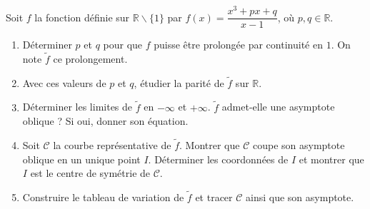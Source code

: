 \documentclass[11pt]{article}
\def\setminus{\mathbin{\backslash}}\let\smallsetminus\setminus
\begin{document}
\begin{exercice}
Soit $f$ la fonction définie sur $\mathbb{R} \setminus \{1\}$ par $f(x) = \dfrac{x^3 + px + q}{x-1}$, où $p,q \in \mathbb{R}$.
\begin{enumerate}
    \item Déterminer $p$ et $q$ pour que $f$ puisse être prolongée par continuité en $1$. On note $\tilde{f}$ ce prolongement.
    \item Avec ces valeurs de $p$ et $q$, étudier la parité de $\tilde{f}$ sur $\mathbb{R}$.
    \item Déterminer les limites de $\tilde{f}$ en $-\infty$ et $+\infty$. $\tilde{f}$ admet-elle une asymptote oblique ? Si oui, donner son équation.
    \item Soit $\mathcal{C}$ la courbe représentative de $\tilde{f}$. Montrer que $\mathcal{C}$ coupe son asymptote oblique en un unique point $I$. Déterminer les coordonnées de $I$ et montrer que $I$ est le centre de symétrie de $\mathcal{C}$.
    \item Construire le tableau de variation de $\tilde{f}$ et tracer $\mathcal{C}$ ainsi que son asymptote.
\end{enumerate}
\end{exercice}
\end{document}
